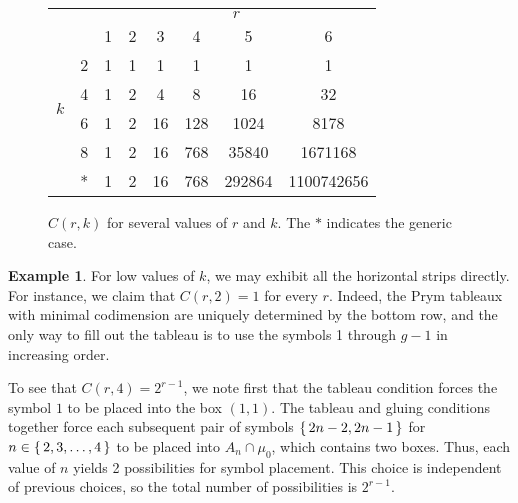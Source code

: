 \documentclass[11pt,reqno]{amsart}
\theoremstyle{definition}
\theoremstyle{problem}
\newtheorem{example}[definition]{Example}
\theoremstyle{plain}
\theoremstyle{remark}
\theoremstyle{theorem}
\numberwithin{equation}{section}
\numberwithin{figure}{section}
\begin{document}

\begin{figure}[htb]
    \centering
    \begin{tabular}{c c|c c c c c c|}
    \cline{3-8}
    & & \multicolumn{6}{c|}{$r$}\\ \cline{3-8}
    & & 1 & 2 & 3 & 4 & 5 & 6 \\\cline{1-8}
    \multicolumn{1}{|c|}{\multirow{4}{*}{$k$}} & 2 & 1 & 1 & 1 & 1 & 1 & 1\\
    \multicolumn{1}{|c|}{} & 4 & 1 & 2 & 4 & 8 & 16 & 32\\
    \multicolumn{1}{|c|}{} & 6 & 1 & 2 & 16 & 128 & 1024 & 8178\\
    \multicolumn{1}{|c|}{} & 8 & 1 & 2 & 16 & 768 & 35840 & 1671168\\
    \multicolumn{1}{|c|}{} & * & 1 & 2 & 16 & 768 & 292864 & 1100742656\\\hline
    \end{tabular}
    \caption{$C(r,k)$ for several values of $r$ and $k$.  The $*$
      indicates the generic case.}
    \label{figure:keven}
\end{figure}

\begin{example}
  For low values of $k$, we may exhibit all the horizontal strips
  directly. For instance, we claim that $C(r,2)=1$ for every $r$.
  Indeed, the Prym tableaux with minimal codimension are uniquely
  determined by the bottom row, and the only way to fill out the
  tableau is to use the symbols 1 through $g-1$ in increasing order.

  To see that $C(r,4)=2^{r-1}$, we note first that the tableau
  condition forces the symbol $1$ to be placed into the box $(1,1)$.
  The tableau and gluing conditions together force each subsequent
  pair of symbols $\set{2n-2, 2n-1}$ for $n \in \set{2,3,\ldots,4}$ to
  be placed into $A_n \cap \mu_0$, which contains two boxes.  Thus,
  each value of $n$ yields 2 possibilities for symbol placement.
  This choice is independent of previous choices, so the total number
  of possibilities is $2^{r-1}$.
 	
 	 
\end{example}
\end{document}
